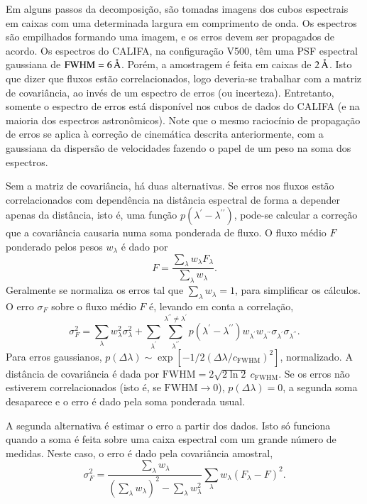 Em alguns passos da decomposição, são tomadas imagens dos cubos espectrais em
caixas com uma determinada largura em comprimento de onda. Os espectros são
empilhados formando uma imagem, e os erros devem ser propagados de acordo. Os
espectros do CALIFA, na configuração V500, têm uma PSF espectral gaussiana de
$\mathrm{FWHM}=6\,\text{\normalfont\AA}$. Porém, a amostragem é feita em caixas de
$2\,\text{\normalfont\AA}$. Isto que dizer que fluxos estão correlacionados, logo deveria-se
trabalhar com a matriz de covariância, ao invés de um espectro de erros (ou
incerteza). Entretanto, somente o espectro de erros está disponível nos cubos de
dados do CALIFA (e na maioria dos espectros astronômicos). Note que o mesmo
raciocínio de propagação de erros se aplica à correção de cinemática descrita
anteriormente, com a gaussiana da dispersão de velocidades fazendo o papel de um
peso na soma dos espectros.

Sem a matriz de covariância, há duas alternativas. Se erros nos fluxos estão
correlacionados com dependência na distância espectral de forma a depender
apenas da distância, isto é, uma função $p(\lambda^\prime -
\lambda^{\prime\prime})$, pode-se calcular a correção que a covariância causaria
numa soma ponderada de fluxo. O fluxo médio $F$ ponderado pelos pesos
$w_\lambda$ é dado por
\begin{equation*}
F = \frac{\sum\limits_\lambda w_\lambda F_\lambda}{\sum\limits_\lambda
w_\lambda}.
\end{equation*}
Geralmente se normaliza os erros tal que $\sum\limits_\lambda
w_\lambda = 1$, para simplificar os cálculos. O erro $\sigma_F$ sobre o fluxo
médio $F$ é, levando em conta a correlação,
\begin{equation*}
\sigma_F^2 = \sum\limits_\lambda w_\lambda^2 \sigma_\lambda^2 +
\sum\limits_{\lambda^\prime}
\sum\limits_{\lambda^{\prime\prime}}^{\lambda^{\prime\prime} \neq
\lambda^\prime} p(\lambda^\prime - \lambda^{\prime\prime}) w_{\lambda^\prime}
w_{\lambda^{\prime\prime}} \sigma_{\lambda^\prime}
\sigma_{\lambda^{\prime\prime}}.
\end{equation*}
Para erros gaussianos, $p(\Delta \lambda) \sim \exp\left[-1/2
(\Delta\lambda / c_\mathrm{FWHM})^2\right]$, normalizado. A distância de
covariância é dada por $\mathrm{FWHM} = 2 \sqrt{2 \ln 2}\ c_\mathrm{FWHM}$. Se
os erros não estiverem correlacionados (isto é, se $\mathrm{FWHM} \to 0$),
$p(\Delta \lambda) = 0$, a segunda soma desaparece e o erro é dado pela soma
ponderada usual.

A segunda alternativa é estimar o erro a partir dos dados. Isto só funciona
quando a soma é feita sobre uma caixa espectral com um grande número de medidas.
Neste caso, o erro é dado pela covariância amostral,
\begin{equation*}
\sigma_F^2 = \dfrac{\sum\limits_\lambda w_\lambda}{\left(\sum\limits_\lambda
w_\lambda\right)^2 - \sum\limits_\lambda w_\lambda^2} \sum\limits_\lambda
w_\lambda \left(F_\lambda - F\right)^2.
\end{equation*}

